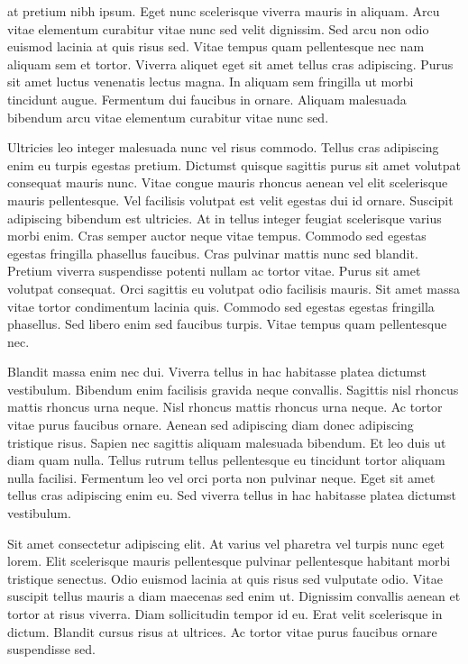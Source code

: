 \begin{acknowledgements}
at pretium nibh ipsum. Eget nunc scelerisque viverra mauris in aliquam. Arcu vitae elementum curabitur vitae nunc sed velit dignissim. Sed arcu non odio euismod lacinia at quis risus sed. Vitae tempus quam pellentesque nec nam aliquam sem et tortor. Viverra aliquet eget sit amet tellus cras adipiscing. Purus sit amet luctus venenatis lectus magna. In aliquam sem fringilla ut morbi tincidunt augue. Fermentum dui faucibus in ornare. Aliquam malesuada bibendum arcu vitae elementum curabitur vitae nunc sed.

Ultricies leo integer malesuada nunc vel risus commodo. Tellus cras adipiscing enim eu turpis egestas pretium. Dictumst quisque sagittis purus sit amet volutpat consequat mauris nunc. Vitae congue mauris rhoncus aenean vel elit scelerisque mauris pellentesque. Vel facilisis volutpat est velit egestas dui id ornare. Suscipit adipiscing bibendum est ultricies. At in tellus integer feugiat scelerisque varius morbi enim. Cras semper auctor neque vitae tempus. Commodo sed egestas egestas fringilla phasellus faucibus. Cras pulvinar mattis nunc sed blandit. Pretium viverra suspendisse potenti nullam ac tortor vitae. Purus sit amet volutpat consequat. Orci sagittis eu volutpat odio facilisis mauris. Sit amet massa vitae tortor condimentum lacinia quis. Commodo sed egestas egestas fringilla phasellus. Sed libero enim sed faucibus turpis. Vitae tempus quam pellentesque nec.

Blandit massa enim nec dui. Viverra tellus in hac habitasse platea dictumst vestibulum. Bibendum enim facilisis gravida neque convallis. Sagittis nisl rhoncus mattis rhoncus urna neque. Nisl rhoncus mattis rhoncus urna neque. Ac tortor vitae purus faucibus ornare. Aenean sed adipiscing diam donec adipiscing tristique risus. Sapien nec sagittis aliquam malesuada bibendum. Et leo duis ut diam quam nulla. Tellus rutrum tellus pellentesque eu tincidunt tortor aliquam nulla facilisi. Fermentum leo vel orci porta non pulvinar neque. Eget sit amet tellus cras adipiscing enim eu. Sed viverra tellus in hac habitasse platea dictumst vestibulum.

Sit amet consectetur adipiscing elit. At varius vel pharetra vel turpis nunc eget lorem. Elit scelerisque mauris pellentesque pulvinar pellentesque habitant morbi tristique senectus. Odio euismod lacinia at quis risus sed vulputate odio. Vitae suscipit tellus mauris a diam maecenas sed enim ut. Dignissim convallis aenean et tortor at risus viverra. Diam sollicitudin tempor id eu. Erat velit scelerisque in dictum. Blandit cursus risus at ultrices. Ac tortor vitae purus faucibus ornare suspendisse sed.
\end{acknowledgements}

\tableofcontents
